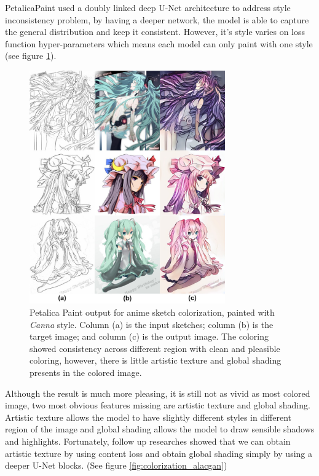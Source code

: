 PetalicaPaint\cite{PetalicaPaint} used a doubly linked deep U-Net architecture to address style inconsistency problem, by having a deeper network, the model is able to capture the general distribution and keep it consistent. However, it's style varies on loss function hyper-parameters which means each model can only paint with one style (see figure \ref{fig:colorization_petalica}).


\begin{figure}
    \centering
    \includegraphics[width=0.75\textwidth]{images/colorization/petalica.jpg}
    \caption{Petalica Paint output for anime sketch colorization, painted with \textit{Canna\protect\footnotemark}  style. Column (a) is the input sketches; column (b) is the target image; and column (c) is the output image.\cite{steinsDeepLearningProject2022} The coloring showed consistency across different region with clean and pleasible coloring, however, there is little artistic texture and global shading presents in the colored image.} 
    \label{fig:colorization_petalica}
\end{figure}


Although the result is much more pleasing, it is still not as vivid as most colored image, two most obvious features missing are artistic texture and global shading. Artistic texture allows the model to have slightly different styles in different region of the image and global shading allows the model to draw sensible shadows and highlights. Fortunately, follow up researches showed that we can obtain artistic texture by using content loss and obtain global shading simply by using a deeper U-Net blocks.\cite{ciUserGuidedDeepAnime2018} (See figure \ref{fig:colorization_alacgan})

